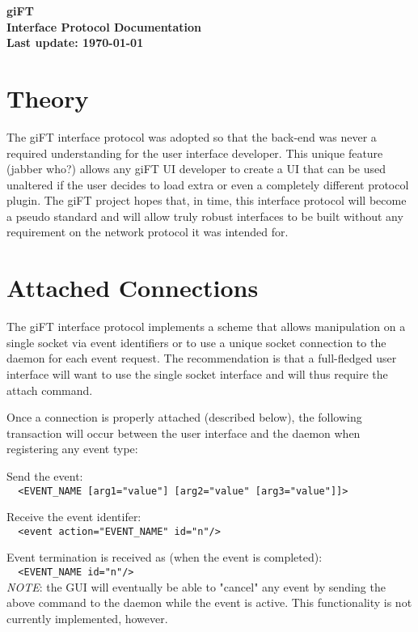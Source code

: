 \documentclass[10pt]{article}
\begin{document}
\begin{center}
\textsf{\textbf{\Huge{giFT}\\ \huge{Interface Protocol Documentation}\\
\normalsize{Last update: \today}}}
\end{center}

\tableofcontents

\addtolength{\parskip}{1.4ex}

\section{Theory}
The giFT interface protocol was adopted so that the back-end was never a
required understanding for the user interface developer.  This unique feature
(jabber who?) allows any giFT UI developer to create a UI that can be used
unaltered if the user decides to load extra or even a completely different
protocol plugin.  The giFT project hopes that, in time, this interface protocol
will become a pseudo standard and will allow truly robust interfaces to be
built without any requirement on the network protocol it was intended for.

\section{Attached Connections}
The giFT interface protocol implements a scheme that allows manipulation on a
single socket via event identifiers or to use a unique socket connection to the
daemon for each event request. The recommendation is that a full-fledged user
interface will want to use the single socket interface and will thus require
the attach command.

Once a connection is properly attached (described below), the following
transaction will occur between the user interface and the daemon when
registering any event type:

Send the event:\\
\verb|  <EVENT_NAME [arg1="value"] [arg2="value" [arg3="value"]]>|

Receive the event identifer:\\ 
\verb|  <event action="EVENT_NAME" id="n"/>|

Event termination is received as (when the event is completed):\\
\verb|  <EVENT_NAME id="n"/>|\\
\emph{NOTE}: the GUI will eventually be able to "cancel" any event by sending
the above command to the daemon while the event is active. This functionality
is not currently implemented, however. 
\end{document}
